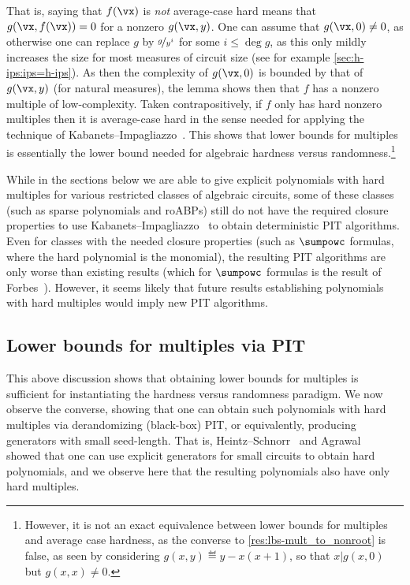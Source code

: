 \documentclass{toc}
\begin{document}
That is, saying that $f(\vx)$ is \emph{not} average-case hard means that $g(\vx,f(\vx))=0$ for a nonzero $g(\vx,y)$.  One can assume that $g(\vx,0)\ne 0$, as otherwise one can replace $g$ by $\nicefrac{g}{y^i}$ for some $i\le \deg g$, as this only mildly increases the size for most measures of circuit size (see for example \autoref{sec:h-ips:ips=h-ips}).  As then the complexity of $g(\vx,0)$ is bounded by that of $g(\vx,y)$ (for natural measures), the lemma shows then that $f$ has a nonzero multiple of low-complexity.  Taken contrapositively, if $f$ only has hard nonzero multiples then it is average-case hard in the sense needed for applying the technique of Kabanets--Impagliazzo~\cite{KabanetsImpagliazzo04}. This shows that lower bounds for multiples is essentially the lower bound needed for algebraic hardness versus randomness.\footnote{However, it is not an exact equivalence between lower bounds for multiples and average case hardness, as the converse to \autoref{res:lbs-mult_to_nonroot} is false, as seen by considering $g(x,y)\eqdef y-x(x+1)$, so that $x|g(x,0)$ but $g(x,x)\ne 0$.}

While in the
%
sections below  %
we are able to give explicit polynomials with hard multiples for various restricted classes of algebraic circuits, some of these classes (such as sparse polynomials and roABPs) still do not have the required closure properties to use Kabanets--Impagliazzo~\cite{KabanetsImpagliazzo04} to obtain deterministic PIT algorithms.  Even for classes with the needed closure properties (such as $\sumpowc$ formulas, where the hard polynomial is the monomial), the resulting PIT algorithms are only worse than existing results (which for $\sumpowc$ formulas is the result of Forbes~\cite{Forbes15}).  However, it seems likely that future results establishing polynomials with hard multiples would imply new PIT algorithms.

\subsection{Lower bounds for multiples via PIT}\label{sec:lb-via-pit}

This above discussion shows that obtaining lower bounds for multiples is sufficient for instantiating the hardness versus randomness paradigm.  We now observe the converse, showing that one can obtain such polynomials with hard multiples via derandomizing (black-box) PIT, or equivalently, producing generators with small seed-length.  That is, Heintz--Schnorr~\cite{HeintzSchnorr80} and Agrawal~\cite{Agrawal05} showed that one can use explicit generators for small circuits to obtain hard polynomials, and we observe here that the resulting polynomials also have only hard multiples.
\end{document}
